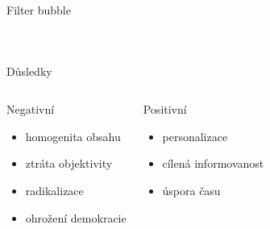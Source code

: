 \documentclass[notheorems,12pt]{beamer}
\begin{document}
\begin{frame}{Filter bubble}
\begin{columns}
\begin{figure}
        \end{figure}
    \end{columns}
\end{frame}
\begin{frame}{Důsledky}
\begin{columns}
	\column{6cm}
	\begin{block}{Negativní}
		\begin{itemize}
			\item homogenita obsahu
            \item ztráta objektivity
            \item radikalizace
            \item ohrožení demokracie
		\end{itemize}
	\end{block}
	\column{6cm}
	\begin{block}{Positivní}
		\begin{itemize}
			\item personalizace
            \item cílená informovanost
            \item úspora času
		\end{itemize}
	\end{block}
\end{columns}
\end{frame}
\end{document}

